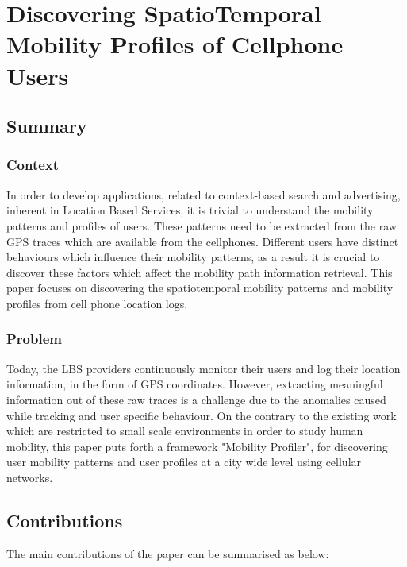 \newpage
\section{Discovering SpatioTemporal Mobility Profiles of Cellphone Users~\cite{DBLP:conf/wowmom/BayirDE09}} \label{lect3}

\subsection*{Summary}

\subsubsection*{Context}

In order to develop applications, related to context-based search and advertising, inherent
in Location Based Services, it is trivial to understand the mobility patterns and profiles of
users. These patterns need to be extracted from the raw GPS traces which are available from the 
cellphones. Different users have distinct behaviours which influence their mobility patterns, as 
a result it is crucial to discover these factors which affect the mobility path information
retrieval. This paper focuses on discovering the spatiotemporal mobility patterns and mobility
profiles from cell phone location logs.  
   

\subsubsection*{Problem}

Today, the LBS providers continuously monitor their users and log their location information, in 
the form of GPS coordinates. However, extracting meaningful information out of these raw traces is
a challenge due to the anomalies caused while tracking and user specific behaviour. On the 
contrary to the existing work which are restricted to small scale environments in order to 
study human mobility, this paper puts forth a framework "Mobility Profiler", for discovering user
mobility patterns and user profiles at a city wide level using cellular networks.  

\subsection*{Contributions}

The main contributions of the paper can be summarised as below:

